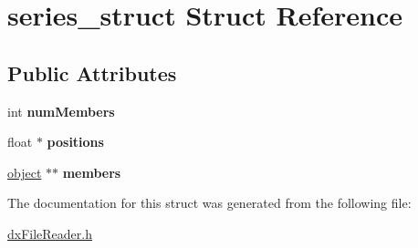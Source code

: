 \hypertarget{structseries__struct}{
\section{series\_\-struct Struct Reference}
\label{structseries__struct}
}
\subsection*{Public Attributes}
\begin{DoxyCompactItemize}
\item 
\hypertarget{structseries__struct_a9a3582db84a9ef80a1155cb05688bbb3}{
int {\bfseries numMembers}}
\label{structseries__struct_a9a3582db84a9ef80a1155cb05688bbb3}

\item 
\hypertarget{structseries__struct_a95b799e56a0a63bb92fe647450f13b32}{
float $\ast$ {\bfseries positions}}
\label{structseries__struct_a95b799e56a0a63bb92fe647450f13b32}

\item 
\hypertarget{structseries__struct_a4bbeb1aba98b6bdbaff00b9b2f90d129}{
\hyperlink{structobject__struct}{object} $\ast$$\ast$ {\bfseries members}}
\label{structseries__struct_a4bbeb1aba98b6bdbaff00b9b2f90d129}

\end{DoxyCompactItemize}


The documentation for this struct was generated from the following file:\begin{DoxyCompactItemize}
\item 
\hyperlink{dxFileReader_8h}{dxFileReader.h}\end{DoxyCompactItemize}
